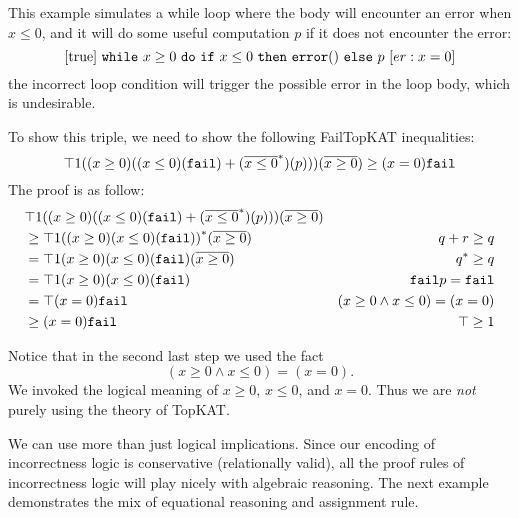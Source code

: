 \begin{example}
    This example simulates a while loop where the body will encounter an error when \(x \leq 0\),
    and it will do some useful computation \(p\) if it does not encounter the error:
    \[
        [\mathrm{true}]~\mathtt{while}~x \geq 0~\mathtt{do}~\mathtt{if}~x \leq 0~\mathtt{then}~\mathtt{error ()}~\mathtt{else}~p~[\mathinner{er}: x = 0]
    \]
    the incorrect loop condition will trigger the possible error in the loop body,
    which is undesirable.


To show this triple, we need to show the following FailTopKAT inequalities:
\[
    \top 1 {((x \geq 0) ((x \leq 0) (\mathtt{fail}) + (\overline{x \leq 0}^*) (p)))} (\overline{x \geq 0}) \geq 
    (x = 0) \mathtt{fail}
\]
The proof is as follow: 
\begin{align*}
    & \top 1 {((x \geq 0) ((x \leq 0) (\mathtt{fail}) + (\overline{x \leq 0}^*) (p)))} (\overline{x \geq 0})\\
    & \geq \top 1 {((x \geq 0) (x \leq 0) (\mathtt{fail}))}^* (\overline{x \geq 0})
        & q + r \geq q\\
    & = \top 1 (x \geq 0) (x \leq 0) (\mathtt{fail}) (\overline{x \geq 0})
        & {q}^* \geq q \\
    & = \top 1 (x \geq 0) (x \leq 0) (\mathtt{fail}) 
        & \mathtt{fail} p = \mathtt{fail} \\
    & = \top (x = 0) \mathtt{fail} 
        & (x \geq 0 \land x \leq 0) = (x = 0)\\
    & \geq (x = 0) \mathtt{fail} & \top \geq 1
\end{align*}

Notice that in the second last step we used the fact 
\[(x \geq 0 \land x \leq 0) = (x = 0).\]
We invoked the logical meaning of \(x \geq 0\), \(x \leq 0\), and \(x = 0\).
Thus we are \emph{not} purely using the theory of TopKAT.
\end{example}

We can use more than just logical implications.
Since our encoding of incorrectness logic is conservative (relationally valid), 
all the proof rules of incorrectness logic will play nicely with algebraic reasoning.
The next example demonstrates the mix of equational reasoning and assignment rule.


